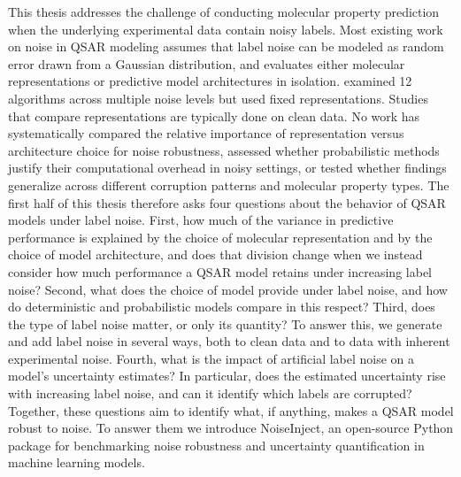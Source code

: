 This thesis addresses the challenge of conducting molecular property prediction when the underlying experimental data contain noisy labels. Most existing work on noise in QSAR modeling assumes that label noise can be modeled as random error drawn from a Gaussian distribution, and evaluates either molecular representations or predictive model architectures in isolation. \citet{Cortes2015} examined 12 algorithms across multiple noise levels but used fixed representations. Studies that compare representations are typically done on clean data. No work has systematically compared the relative importance of representation versus architecture choice for noise robustness, assessed whether probabilistic methods justify their computational overhead in noisy settings, or tested whether findings generalize across different corruption patterns and molecular property types. The first half of this thesis therefore asks four questions about the behavior of QSAR models under label noise.\label{sec:intro:questions} First, how much of the variance in predictive performance is explained by the choice of molecular representation and by the choice of model architecture, and does that division change when we instead consider how much performance a QSAR model retains under increasing label noise? Second, what does the choice of model provide under label noise, and how do deterministic and probabilistic models compare in this respect? Third, does the type of label noise matter, or only its quantity? To answer this, we generate and add label noise in several ways, both to clean data and to data with inherent experimental noise. Fourth, what is the impact of artificial label noise on a model's uncertainty estimates? In particular, does the estimated uncertainty rise with increasing label noise, and can it identify which labels are corrupted? Together, these questions aim to identify what, if anything, makes a QSAR model robust to noise. To answer them we introduce NoiseInject, an open-source Python package for benchmarking noise robustness and uncertainty quantification in machine learning models.

